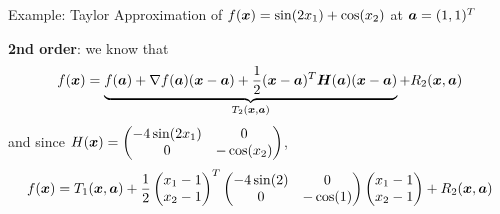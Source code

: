 \documentclass[11pt,compress,t,notes=noshow, xcolor=table]{beamer}
\begin{document}
\begin{framev}{Example: Taylor Approximation of $\fx = \sin(2\MakeLowercase{x}_1) + \cos(\MakeLowercase{x}_2)$ at $\bm{\MakeLowercase{a}} = (1, 1)^T$}
\,\\
\begin{footnotesize}
\textbf{2nd order}: we know that
$$
f(\bm{x}) = \underbrace{f(\bm{a}) + \nabla f(\bm{a}) (\bm{x} - \bm{a}) + \frac{1}{2}(\bm{x} - \bm{a})^T\bm{H}(\bm{a})(\bm{x} - \bm{a})}_{T_2(\bm{x}, \bm{a})} + R_2(\bm{x},\bm{a})
$$
and since $H(\bm{x}) = \begin{pmatrix} -4 \sin(2x_1) & 0 \\ 0 & -\cos(x_2) \end{pmatrix}$,
$$
f(\bm{x}) = T_1(\bm{x}, \bm{a}) + \frac{1}{2}\begin{pmatrix}x_1 - 1 \\ x_2 - 1 \end{pmatrix}^T \begin{pmatrix} -4 \sin(2) & 0 \\ 0 & -\cos(1) \end{pmatrix} \begin{pmatrix}x_1 - 1 \\ x_2 - 1 \end{pmatrix} + R_2(\bm{x}, \bm{a})
$$
\end{footnotesize}
\vspace*{-0.5\baselineskip}
\end{framev}

\endlecture
\end{document}
